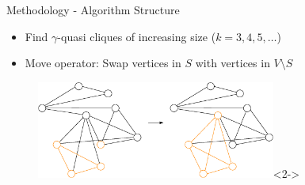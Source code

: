 \documentclass{beamer}
\begin{document}
\begin{frame}{Methodology - Algorithm Structure}
    \begin{itemize}
        \item<1-> Find $\gamma$-quasi cliques of increasing size ($k=3,4,5,\dots$)
        \item<2-> Move operator: Swap vertices in $S$ with vertices in $V \setminus S$
    \end{itemize}
    
\begin{figure}
    \centering
    \includegraphics[width=0.7\textwidth]{graphics/graph-after-swap.eps}<2->
\end{figure}
\end{frame}

    



        
\end{document}
